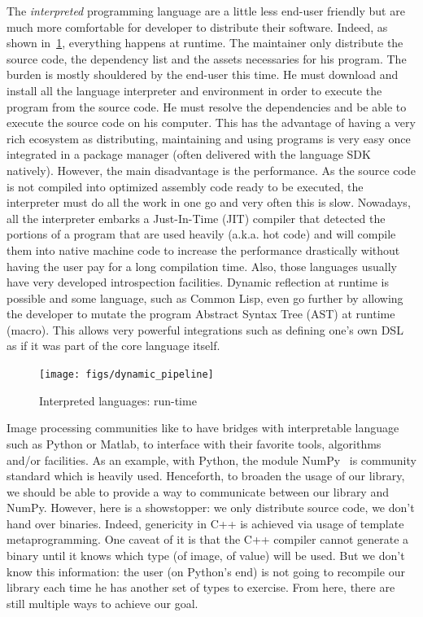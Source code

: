 The \emph{interpreted} programming language are a little less end-user friendly but are much more comfortable for
developer to distribute their software. Indeed, as shown in~\cref{fig:static.dynamic.dynamic.pipeline}, everything
happens at runtime. The maintainer only distribute the source code, the dependency list and the assets necessaries for
his program. The burden is mostly shouldered by the end-user this time. He must download and install all the language
interpreter and environment in order to execute the program from the source code. He must resolve the dependencies and
be able to execute the source code on his computer. This has the advantage of having a very rich ecosystem as
distributing, maintaining and using programs is very easy once integrated in a package manager (often delivered with the
language SDK natively). However, the main disadvantage is the performance. As the source code is not compiled into
optimized assembly code ready to be executed, the interpreter must do all the work in one go and very often this is
slow. Nowadays, all the interpreter embarks a Just-In-Time (JIT) compiler that detected the portions of a program that
are used heavily (a.k.a. hot code) and will compile them into native machine code to increase the performance
drastically without having the user pay for a long compilation time. Also, those languages usually have very developed
introspection facilities. Dynamic reflection at runtime is possible and some language, such as Common Lisp, even go
further by allowing the developer to mutate the program Abstract Syntax Tree (AST) at runtime (macro). This allows very
powerful integrations such as defining one's own DSL as if it was part of the core language itself.

\begin{figure}[tbh]
  \centering
  \texttt{[image: figs/dynamic\_pipeline]}
  \caption{Interpreted languages: run-time}
  \label{fig:static.dynamic.dynamic.pipeline}
\end{figure}

Image processing communities like to have bridges with interpretable language such as Python or Matlab, to interface
with their favorite tools, algorithms and/or facilities. As an example, with Python, the module
NumPy~\cite{oliphant.2006.numpy} is community standard which is heavily used. Henceforth, to broaden the usage of our
library, we should be able to provide a way to communicate between our library and NumPy. However, here is a showstopper:
we only distribute source code, we don't hand over binaries. Indeed, genericity in C++ is achieved via usage of template
metaprogramming. One caveat of it is that the C++ compiler cannot generate a binary until it knows which type (of image,
of value) will be used. But we don't know this information: the user (on Python's end) is not going to recompile our
library each time he has another set of types to exercise. From here, there are still multiple ways to achieve our goal.

